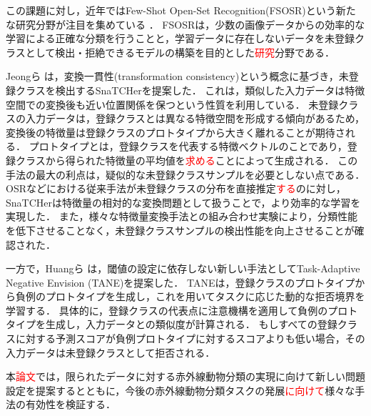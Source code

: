 \documentclass[a4paper,11pt,nomag]{jsreport}
\begin{document}
この課題に対し，近年ではFew-Shot Open-Set Recognition(FSOSR)という新たな研究分野が注目を集めている \cite{peeler, che2023}．
FSOSRは，少数の画像データからの効率的な学習による正確な分類を行うことと，学習データに存在しないデータを未登録クラスとして検出・拒絶できるモデルの構築を目的とした\textcolor{red}{研究}分野である．

Jeongら \cite{snatcher}は，変換一貫性(transformation consistency)という概念に基づき，未登録クラスを検出するSnaTCHerを提案した．
これは，類似した入力データは特徴空間での変換後も近い位置関係を保つという性質を利用している．
未登録クラスの入力データは，登録クラスとは異なる特徴空間を形成する傾向があるため，変換後の特徴量は登録クラスのプロトタイプから大きく離れることが期待される．
プロトタイプとは，登録クラスを代表する特徴ベクトルのことであり，登録クラスから得られた特徴量の平均値を\textcolor{red}{求める}ことによって生成される．
この手法の最大の利点は，疑似的な未登録クラスサンプルを必要としない点である．
OSRなどにおける従来手法が未登録クラスの分布を直接推定\textcolor{red}{する}のに対し，SnaTCHerは特徴量の相対的な変換問題として扱うことで，より効率的な学習を実現した．
また，様々な特徴量変換手法との組み合わせ実験により，分類性能を低下させることなく，未登録クラスサンプルの検出性能を向上させることが確認された．

一方で，Huangら \cite{tane}は，閾値の設定に依存しない新しい手法としてTask-Adaptive Negative Envision (TANE)を提案した．
TANEは，登録クラスのプロトタイプから負例のプロトタイプを生成し，これを用いてタスクに応じた動的な拒否境界を学習する．
具体的に，登録クラスの代表点に注意機構を適用して負例のプロトタイプを生成し，入力データとの類似度が計算される．
もしすべての登録クラスに対する予測スコアが負例プロトタイプに対するスコアよりも低い場合，その入力データは未登録クラスとして拒否される．

本\textcolor{red}{論文}では，限られたデータに対する赤外線動物分類の実現に向けて新しい問題設定を提案するとともに，今後の赤外線動物分類タスクの発展\textcolor{red}{に向けて}様々な手法の有効性を検証する．



\end{document}
